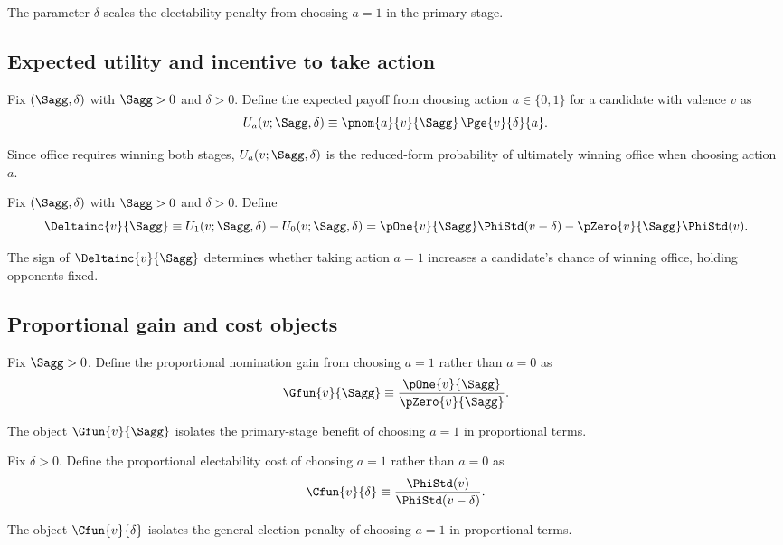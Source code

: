 The parameter $\delta$ scales the electability penalty from choosing $a=1$ in the primary stage.


\subsection*{Expected utility and incentive to take action}
\begin{definition}\label{def:Urf}
Fix $(\Sagg,\delta)$ with $\Sagg>0$ and $\delta>0$. Define the expected payoff from choosing action $a\in\{0,1\}$ for a candidate with valence $v$ as
\[
    U_a(v;\Sagg,\delta) \equiv \pnom{a}{v}{\Sagg}\, \Pge{v}{\delta}{a}.
\]
\end{definition}


Since office requires winning both stages, $U_a(v;\Sagg,\delta)$ is the reduced-form probability of ultimately winning office when choosing action $a$.


\begin{definition}\label{def:Delta}
Fix $(\Sagg,\delta)$ with $\Sagg>0$ and $\delta>0$. Define
\[
    \Deltainc{v}{\Sagg}
    \equiv
    U_1(v;\Sagg,\delta) - U_0(v;\Sagg,\delta)
    =
    \pOne{v}{\Sagg}\PhiStd(v-\delta) - \pZero{v}{\Sagg}\PhiStd(v).
\]
\end{definition}


The sign of $\Deltainc{v}{\Sagg}$ determines whether taking action $a=1$ increases a candidate's chance of winning office, holding opponents fixed.


\subsection{Proportional gain and cost objects}
\begin{definition}\label{def:Gbasic}
Fix $\Sagg>0$. Define the proportional nomination gain from choosing $a=1$ rather than $a=0$ as
\[
    \Gfun{v}{\Sagg} \equiv \frac{\pOne{v}{\Sagg}}{\pZero{v}{\Sagg}}.
\]
\end{definition}


The object $\Gfun{v}{\Sagg}$ isolates the primary-stage benefit of choosing $a=1$ in proportional terms.


\begin{definition}\label{def:Cbasic}
Fix $\delta>0$. Define the proportional electability cost of choosing $a=1$ rather than $a=0$ as
\[
    \Cfun{v}{\delta} \equiv \frac{\PhiStd(v)}{\PhiStd(v-\delta)}.
\]
\end{definition}


The object $\Cfun{v}{\delta}$ isolates the general-election penalty of choosing $a=1$ in proportional terms.

